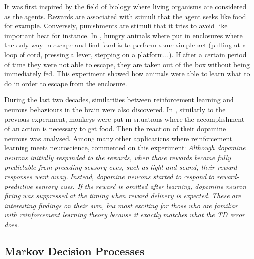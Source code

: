 			It was first inspired by the field of biology where living organisms are considered as the agents. Rewards are associated with stimuli that the agent seeks like food for example. Conversely, punishments are stimuli that it tries to avoid like important heat for instance. In \cite{Thorndike1898}, hungry animals where put in enclosures where the only way to escape and find food is to perform some simple act (pulling at a loop of cord, pressing a lever, stepping on a platform...). If after a certain period of time they were not able to escape, they are taken out of the box without being immediately fed. This experiment showed how animals were able to learn what to do in order to escape from the enclosure.
			
			During the last two decades, similarities between reinforcement learning and neurons behaviours in the brain were also discovered. In \cite{Schultz1995,Schultz1998}, similarly to the previous experiment, monkeys were put in situations where the accomplishment of an action is necessary to get food. Then the reaction of their dopamine neurons was analysed. Among many other applications where reinforcement learning meets neuroscience, \cite{Doya2007} commented on this experiment: \textit{Although dopamine neurons initially responded to the rewards, when those rewards became fully predictable from preceding sensory cues, such as light and sound, their reward responses went away. Instead, dopamine neurons started to respond to reward-predictive sensory cues. If the reward is omitted after learning, dopamine neuron firing was suppressed at the timing when reward delivery is expected. These are interesting findings on their own, but most exciting for those who are familiar with reinforcement learning theory because it exactly matches what the TD error does}.
			
		\subsection{Markov Decision Processes}
        
